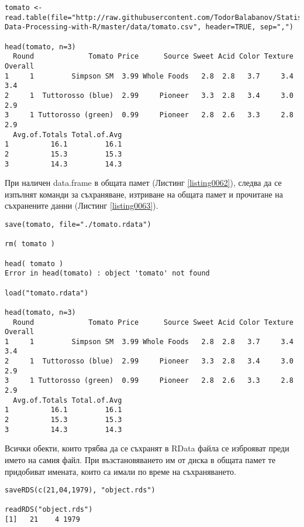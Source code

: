 \begin{lstlisting}[caption=Използване на множество от данни, label=listing0062]
tomato <- read.table(file="http://raw.githubusercontent.com/TodorBalabanov/Statistical-Data-Processing-with-R/master/data/tomato.csv", header=TRUE, sep=",")

head(tomato, n=3)
  Round             Tomato Price      Source Sweet Acid Color Texture Overall
1     1         Simpson SM  3.99 Whole Foods   2.8  2.8   3.7     3.4     3.4
2     1  Tuttorosso (blue)  2.99     Pioneer   3.3  2.8   3.4     3.0     2.9
3     1 Tuttorosso (green)  0.99     Pioneer   2.8  2.6   3.3     2.8     2.9
  Avg.of.Totals Total.of.Avg
1          16.1         16.1
2          15.3         15.3
3          14.3         14.3
\end{lstlisting}

При наличен data.frame в общата памет (Листинг \ref{listing0062}), следва да се изпълнят команди за съхраняване, изтриване на общата памет и прочитане на съхранените данни (Листинг \ref{listing0063}).

\begin{lstlisting}[caption=Запис и четене в RData файл, label=listing0063]
save(tomato, file="./tomato.rdata")

rm( tomato )

head( tomato )
Error in head(tomato) : object 'tomato' not found

load("tomato.rdata")

head(tomato, n=3)
  Round             Tomato Price      Source Sweet Acid Color Texture Overall
1     1         Simpson SM  3.99 Whole Foods   2.8  2.8   3.7     3.4     3.4
2     1  Tuttorosso (blue)  2.99     Pioneer   3.3  2.8   3.4     3.0     2.9
3     1 Tuttorosso (green)  0.99     Pioneer   2.8  2.6   3.3     2.8     2.9
  Avg.of.Totals Total.of.Avg
1          16.1         16.1
2          15.3         15.3
3          14.3         14.3
\end{lstlisting}

Всички обекти, които трябва да се съхранят в RData файла се изброяват преди името на самия файл. При възстановяването им от диска в общата памет те придобиват имената, които са имали по време на съхраняването. 

\begin{lstlisting}[caption=Запис и четене на един обект, label=listing0064]
saveRDS(c(21,04,1979), "object.rds")

readRDS("object.rds")
[1]   21    4 1979
\end{lstlisting}

